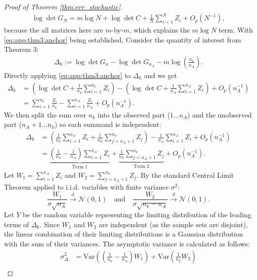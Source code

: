 \documentclass{article}
\theoremstyle{plain}
\theoremstyle{definition}
\theoremstyle{remark}
\begin{document}
\begin{proof}[Proof of Theorem \ref{thm:err_stochastic}]
\begin{align} \label{eq:app:thm3:anchor}
    \log \det G_N = m \log N + \log \det C + \frac{1}{N} \sum_{i=1}^N Z_i + O_p(N^{-1}),
\end{align}
because the all matrices here are $m$-by-$m$, which explains the $m \log N$ term.
With \eqref{eq:app:thm3:anchor} being established, Consider the quantity of interest from Theorem 3:
\begin{align}
    \Delta_k := \log \det G_n - \log \det G_{n_A} - m \log \left(\frac{n_k}{n_A}\right).
\end{align}
Directly applying \eqref{eq:app:thm3:anchor} to $\Delta_k$ and we get
\begin{align}
    \Delta_k &= \left( \log \det C + \frac{1}{n_k} \sum_{i=1}^{n_k} Z_i \right) - \left( \log \det C + \frac{1}{n_A} \sum_{i=1}^{n_A} Z_i \right) + O_p(n_A^{-1}) \nonumber \\
    &= \sum_{i=1}^{n_k} \frac{Z_i}{n_k} - \sum_{i=1}^{n_A} \frac{Z_i}{n_A} + O_p(n_A^{-1}).
\end{align}
We then split the sum over $n_k$ into the observed part ($1 \dots n_A$) and the unobserved part ($n_A+1 \dots n_k$) so each summand is independent:
\begin{align}
    \Delta_k &= \left( \frac{1}{n_k} \sum_{i=1}^{n_A} Z_i + \frac{1}{n_k} \sum_{j=n_A+1}^{n_k} Z_j \right) - \frac{1}{n_A} \sum_{i=1}^{n_A} Z_i + O_p(n_A^{-1}) \nonumber \\
    &= \underbrace{\left( \frac{1}{n_k} - \frac{1}{n_A} \right) \sum_{i=1}^{n_A} Z_i}_{\text{Term 1}} + \underbrace{\frac{1}{n_k} \sum_{j=n_A+1}^{n_k} Z_j}_{\text{Term 2}} + O_p(n_A^{-1}).
\end{align}
Let $W_1 = \sum_{i=1}^{n_A} Z_i$ and $W_2 = \sum_{j=n_A+1}^{n_k} Z_j$.
By the standard Central Limit Theorem applied to i.i.d. variables with finite variance $\sigma^2$:
\begin{equation}
    \frac{W_1}{\sigma \sqrt{n_A}} \xrightarrow{d} \mathcal{N}(0, 1) \quad \text{and} \quad \frac{W_2}{\sigma \sqrt{n_k - n_A}} \xrightarrow{d} \mathcal{N}(0, 1).
\end{equation}
Let $Y$ be the random variable representing the limiting distribution of the leading terms of $\Delta_k$. Since $W_1$ and $W_2$ are independent (as the sample sets are disjoint), the linear combination of their limiting distributions is a Gaussian distribution with the sum of their variances.
The asymptotic variance is calculated as follows:
\begin{align}
    \sigma_{\Delta}^2 &= \text{Var}\left( \left( \frac{1}{n_k} - \frac{1}{n_A} \right) W_1 \right) + \text{Var}\left( \frac{1}{n_k} W_2 \right) \nonumber \\

\end{align}
\end{proof}
\end{document}

